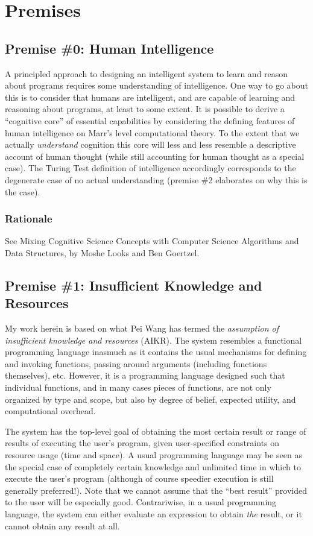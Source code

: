 \documentclass[twoside,11pt]{article}
\begin{document}
\section{Premises}

\subsection{Premise \#0: Human Intelligence}

A principled approach to designing an intelligent system to learn and reason
about programs requires some understanding of intelligence. One way to go about
this is to consider that humans are intelligent, and are capable of learning
and reasoning about programs, at least to some extent. It is possible to derive
a ``cognitive core'' of essential capabilities by considering the defining
features of human intelligence on Marr's level computational theory. To the
extent that we actually \emph{understand} cognition this core will less and
less resemble a descriptive account of human thought (while still accounting
for human thought as a special case). The Turing Test definition of
intelligence accordingly corresponds to the degenerate case of no actual
understanding (premise \#2 elaborates on why this is the case).

\subsubsection{Rationale}

See Mixing Cognitive Science Concepts with Computer Science Algorithms and Data
Structures, by Moshe Looks and Ben Goertzel.

\subsection{Premise \#1:   Insufficient Knowledge and Resources}

My work herein is based on what Pei Wang has termed the \emph{assumption of
  insufficient knowledge and resources} (AIKR). The system resembles a
functional programming language inasmuch as it contains the usual mechanisms
for defining and invoking functions, passing around arguments (including
functions themselves), etc. However, it is a programming language designed such
that individual functions, and in many cases pieces of functions, are not only
organized by type and scope, but also by degree of belief, expected utility,
and computational overhead.

The system has the top-level goal of obtaining the most certain result or range
of results of executing the user's program, given user-specified constraints on
resource usage (time and space). A usual programming language may be seen as
the special case of completely certain knowledge and unlimited time in which to
execute the user's program (although of course speedier execution is still
generally preferred!). Note that we cannot assume that the ``best result''
provided to the user will be especially good. Contrariwise, in a usual
programming language, the system can either evaluate an expression to obtain
\emph{the} result, or it cannot obtain any result at all.
\end{document}
